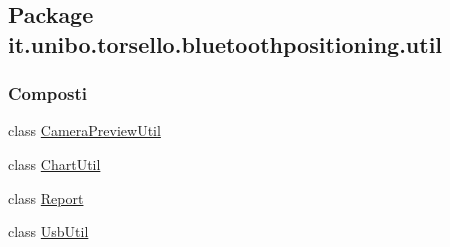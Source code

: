 \hypertarget{namespaceit_1_1unibo_1_1torsello_1_1bluetoothpositioning_1_1util}{}\subsection{Package it.\+unibo.\+torsello.\+bluetoothpositioning.\+util}
\label{namespaceit_1_1unibo_1_1torsello_1_1bluetoothpositioning_1_1util}
\subsubsection*{Composti}
\begin{DoxyCompactItemize}
\item 
class \hyperlink{classit_1_1unibo_1_1torsello_1_1bluetoothpositioning_1_1util_1_1CameraPreviewUtil}{Camera\+Preview\+Util}
\item 
class \hyperlink{classit_1_1unibo_1_1torsello_1_1bluetoothpositioning_1_1util_1_1ChartUtil}{Chart\+Util}
\item 
class \hyperlink{classit_1_1unibo_1_1torsello_1_1bluetoothpositioning_1_1util_1_1Report}{Report}
\item 
class \hyperlink{classit_1_1unibo_1_1torsello_1_1bluetoothpositioning_1_1util_1_1UsbUtil}{Usb\+Util}
\end{DoxyCompactItemize}
